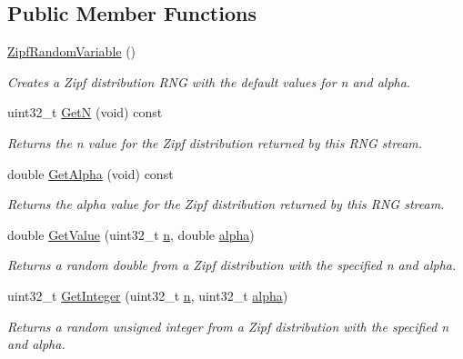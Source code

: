 \subsection*{Public Member Functions}
\begin{DoxyCompactItemize}
\item 
\hyperlink{classns3_1_1ZipfRandomVariable_a93e22966491ba3333f330a5c2ac9b4bd}{Zipf\+Random\+Variable} ()
\begin{DoxyCompactList}\small\item\em Creates a Zipf distribution R\+NG with the default values for n and alpha. \end{DoxyCompactList}\item 
uint32\+\_\+t \hyperlink{classns3_1_1ZipfRandomVariable_a260e2ee846e555cfd275b0a2901d16fe}{GetN} (void) const 
\begin{DoxyCompactList}\small\item\em Returns the n value for the Zipf distribution returned by this R\+NG stream. \end{DoxyCompactList}\item 
double \hyperlink{classns3_1_1ZipfRandomVariable_aef2f50cde1f4ca56564c390f1c725026}{Get\+Alpha} (void) const 
\begin{DoxyCompactList}\small\item\em Returns the alpha value for the Zipf distribution returned by this R\+NG stream. \end{DoxyCompactList}\item 
double \hyperlink{classns3_1_1ZipfRandomVariable_a327ce77bd92ece90f8622b5104850676}{Get\+Value} (uint32\+\_\+t \hyperlink{lte__link__budget__x2__handover__measures_8m_abdb05bc5a064cf642a06c83b3392f148}{n}, double \hyperlink{lte__uplink__power__control_8m_a62197192f0fbf4e0675eb37be1c4c175}{alpha})
\begin{DoxyCompactList}\small\item\em Returns a random double from a Zipf distribution with the specified n and alpha. \end{DoxyCompactList}\item 
uint32\+\_\+t \hyperlink{classns3_1_1ZipfRandomVariable_a1ca161dc237c5648f62ff260240c7fe1}{Get\+Integer} (uint32\+\_\+t \hyperlink{lte__link__budget__x2__handover__measures_8m_abdb05bc5a064cf642a06c83b3392f148}{n}, uint32\+\_\+t \hyperlink{lte__uplink__power__control_8m_a62197192f0fbf4e0675eb37be1c4c175}{alpha})
\begin{DoxyCompactList}\small\item\em Returns a random unsigned integer from a Zipf distribution with the specified n and alpha. \end{DoxyCompactList}\item 

\end{DoxyCompactItemize}
